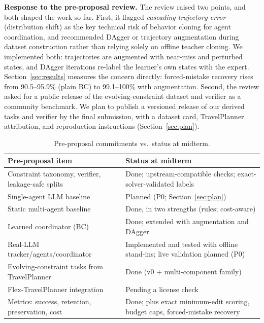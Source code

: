 \documentclass{article}
\begin{document}
\textbf{Response to the pre-proposal review.} The review raised two points,
and both shaped the work so far. First, it flagged \emph{cascading trajectory
error} (distribution shift) as the key technical risk of behavior cloning
for agent coordination, and recommended DAgger or trajectory augmentation
during dataset construction rather than relying solely on offline teacher
cloning. We implemented both: trajectories are augmented with
near-miss and perturbed states, and DAgger iterations re-label the learner's
own states with the expert. Section~\ref{sec:results} measures the concern
directly: forced-mistake recovery rises from 90.5--95.9\% (plain BC) to
99.1--100\% with augmentation. Second, the review asked for a public release
of the evolving-constraint dataset and verifier as a community benchmark.
We plan to publish a versioned release of our derived tasks and verifier by
the final submission, with a dataset card, TravelPlanner attribution, and
reproduction instructions (Section~\ref{sec:plan}).

\begin{table}[t]
\centering
\caption{Pre-proposal commitments vs.\ status at midterm.}
\label{tab:vsproposal}
\small
\begin{tabular}{@{}>{\raggedright\arraybackslash}p{}>{\raggedright\arraybackslash}p{}@{}}
\toprule
\textbf{Pre-proposal item} & \textbf{Status at midterm} \\
\midrule
Constraint taxonomy, verifier, leakage-safe splits &
Done; upstream-compatible checks; exact-solver-validated labels \\
Single-agent LLM baseline & Planned (P0; Section~\ref{sec:plan}) \\
Static multi-agent baseline & Done, in two strengths (rules; cost-aware) \\
Learned coordinator (BC) & Done; extended with augmentation and DAgger \\
Real-LLM tracker/agents/coordinator & Implemented and tested with offline
stand-ins; live validation planned (P0) \\
Evolving-constraint tasks from TravelPlanner & Done (v0 $+$ multi-component
family) \\
Flex-TravelPlanner integration & Pending a license check \\
Metrics: success, retention, preservation, cost & Done; plus exact
minimum-edit scoring, budget caps, forced-mistake recovery \\
\bottomrule
\end{tabular}
\end{table}
\end{document}
